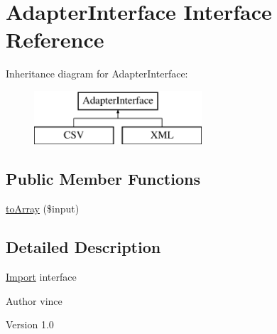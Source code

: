 \hypertarget{interface_anemo_1_1_import_1_1_adapter_1_1_adapter_interface}{
\section{AdapterInterface Interface Reference}
\label{interface_anemo_1_1_import_1_1_adapter_1_1_adapter_interface}
}
Inheritance diagram for AdapterInterface:\begin{figure}[H]
\begin{center}
\leavevmode
\includegraphics[height=2.000000cm]{interface_anemo_1_1_import_1_1_adapter_1_1_adapter_interface}
\end{center}
\end{figure}
\subsection*{Public Member Functions}
\begin{DoxyCompactItemize}
\item 
\hyperlink{interface_anemo_1_1_import_1_1_adapter_1_1_adapter_interface_a75416ddc6d147a0aaca83783f838403a}{toArray} (\$input)
\end{DoxyCompactItemize}


\subsection{Detailed Description}
\hyperlink{class_anemo_1_1_import}{Import} interface \begin{DoxyAuthor}{Author}
vince 
\end{DoxyAuthor}
\begin{DoxyVersion}{Version}
1.0 
\end{DoxyVersion}



